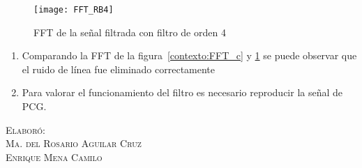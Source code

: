 \documentclass[10pt,letterpaper,spanish,twoside]{report}
\begin{document}
\begin{enumerate}
 \begin{figure}[H]
 	\centering 
 	\texttt{[image: FFT\_RB4]}
 	\caption{FFT de la señal filtrada con filtro de orden 4}
 	\label{contexto:FFT_RB4}
 \end{figure}
 \begin{enumerate}
 	\item Comparando la FFT de la figura~\ref{contexto:FFT_c} y \ref{contexto:FFT_RB4} se puede observar que el ruido de línea fue eliminado correctamente
 	\item Para valorar el funcionamiento del filtro es necesario reproducir la señal de PCG.
 \end{enumerate}
\end{enumerate}


\vfill
\begin{flushright}
\textsc{Elaboró:\\
Ma. del Rosario Aguilar Cruz\\
Enrique Mena Camilo}
\end{flushright}
\end{document}
